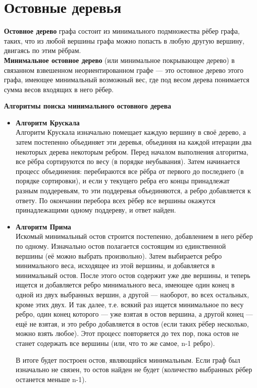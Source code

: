 \section{Остовные деревья}
\textbf{Остовное дерево} графа состоит из минимального подмножества рёбер графа, таких, что из любой вершины графа можно попасть в любую другую вершину, двигаясь по этим рёбрам.\\
\textbf{Минимальное остовное дерево }(или минимальное покрывающее дерево) в связанном взвешенном неориентированном графе — это остовное дерево этого графа, имеющее минимальный возможный вес, где под весом дерева понимается сумма весов входящих в него рёбер.
\begin{center}
	\textbf{Алгоритмы поиска минимального остовного дерева}
\end{center}
\begin{itemize}
	\item \textbf{Алгоритм Крускала}\\
	Алгоритм Крускала изначально помещает каждую вершину в своё дерево, а затем постепенно объединяет эти деревья, объединяя на каждой итерации два некоторых дерева некоторым ребром. Перед началом выполнения алгоритма, все рёбра сортируются по весу (в порядке неубывания). Затем начинается процесс объединения: перебираются все рёбра от первого до последнего (в порядке сортировки), и если у текущего ребра его концы принадлежат разным поддеревьям, то эти поддеревья объединяются, а ребро добавляется к ответу. По окончании перебора всех рёбер все вершины окажутся принадлежащими одному поддереву, и ответ найден.\\
	\item \textbf{Алгоритм Прима}\\
	Искомый минимальный остов строится постепенно, добавлением в него рёбер по одному. Изначально остов полагается состоящим из единственной вершины (её можно выбрать произвольно). Затем выбирается ребро минимального веса, исходящее из этой вершины, и добавляется в минимальный остов. После этого остов содержит уже две вершины, и теперь ищется и добавляется ребро минимального веса, имеющее один конец в одной из двух выбранных вершин, а другой — наоборот, во всех остальных, кроме этих двух. И так далее, т.е. всякий раз ищется минимальное по весу ребро, один конец которого — уже взятая в остов вершина, а другой конец — ещё не взятая, и это ребро добавляется в остов (если таких рёбер несколько, можно взять любое). Этот процесс повторяется до тех пор, пока остов не станет содержать все вершины (или, что то же самое, n-1 ребро).
	
	В итоге будет построен остов, являющийся минимальным. Если граф был изначально не связен, то остов найден не будет (количество выбранных рёбер останется меньше n-1).
\end{itemize}